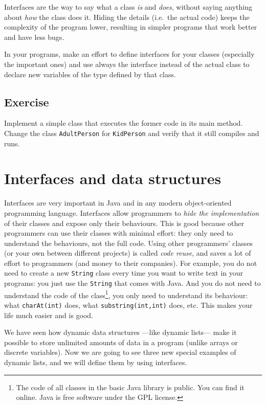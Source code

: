 Interfaces are the way to say what a class \emph{is} and \emph{does},
without saying anything about \emph{how} the class does it. Hiding the
details (i.e.~the actual code) keeps the complexity of the program
lower, resulting in simpler programs that work better and have less
bugs. 

In your programs, make an effort to define interfaces for your classes
(especially the important ones)
and use always the interface instead of the actual class to declare
new variables of the type defined by that class. 

\subsection*{Exercise}
\label{sec:exercise}

Implement a simple class that executes the former code in its main
method. Change the class \verb+AdultPerson+ for \verb+KidPerson+ and
verify that it still compiles and runs. 

\section{Interfaces and data structures}
\label{sec:interfaces-lists}

Interfaces are very important in Java and in any modern
object-oriented programming language. Interfaces allow programmers to
\emph{hide the implementation} of their classes and expose only their
behaviours. This is good because other programmers can use their
classes with minimal effort: they only need to understand the
behaviours, not the full code. Using other programmers' classes (or
your own between different projects) is called \emph{code reuse}, and
saves a lot of effort to programmers (and money to their
companies). For example, you do not need to 
create a new \verb+String+ class every
time you want to write text in your programs: you just use the
\verb+String+ that comes with Java. And you do not need to understand
the code of the class\footnote{The code of all classes in the basic
  Java library is public. You can find it online. Java is free
  software under the GPL license.}, you only need to understand its
behaviour: what \verb+charAt(int)+ does, what
\verb+substring(int,int)+ does, etc. This makes your life much easier
and is good. 

We have seen how dynamic data structures ---like dynamic lists--- 
make it possible to store
unlimited amounts of data in a program (unlike arrays or discrete
variables). Now we are going to see three new special examples of
dynamic lists, and we will define them by using interfaces. 

